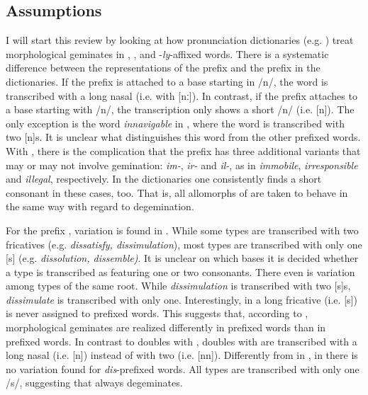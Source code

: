 \subsection{Assumptions } \label{assumption gem English}

I will start this review by looking at how pronunciation dictionaries (e.g. \citealt{Kenyon.1953, Roach.2011, Wells.2008}) treat  morphological geminates in , ,  and \hbox{-}\textit{ly}-affixed words.  There is a systematic difference between the representations of the prefix  and the prefix  in the dictionaries. If the prefix  is attached to a base starting in /n/, the word is transcribed with a long nasal (i.e. with [nː]). In contrast, if the prefix  attaches to a base starting with /n/, the transcription only shows a short /n/ (i.e. [n]). The only exception is the word \textit{innavigable} in \citet{Roach.2011}, where the word is transcribed with two [n]s. It is unclear what distinguishes this word from the other prefixed words. 
  With , there is the complication that the prefix has three additional variants that may or may not involve gemination: \textit{im-}, \textit{ir-} and \textit{il-}, as in \textit{immobile}, \textit{irresponsible} and \textit{illegal}, respectively. In the dictionaries one consistently finds a short consonant in these cases, too. That is, all allomorphs of  are taken to behave in the same way with regard to {degemination}.
  
 For the prefix , variation is found in \cite{Roach.2011}. While some types are transcribed with two fricatives (e.g. \textit{dissatisfy, dissimulation}), most types are transcribed with only one [s] (e.g. \textit{dissolution, dissemble)}. It is unclear on which bases it is decided whether a type is transcribed as featuring one or two consonants. There even is variation among types of the same root. While \textit{dissimulation} is transcribed with two [s]s, \textit{dissimulate} is transcribed with only one. Interestingly, in \cite{Roach.2011}  a long fricative (i.e. [s\textlengthmark]) is never assigned to prefixed words. This suggests that, according to \cite{Roach.2011},  morphological geminates are realized differently in prefixed words than in prefixed words. In contrast to doubles with , doubles with  are transcribed with a long nasal (i.e. [n\textlengthmark])  instead of with two (i.e. [nn]).
 Differently from in \cite{Roach.2011}, in \cite{Wells.2008} there is no variation found for \textit{dis}-prefixed words. All types are transcribed with only one /s/, suggesting that  always {degeminates}. 
  
